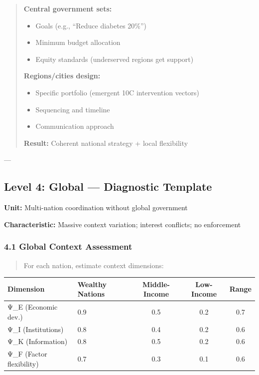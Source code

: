 \begin{quote}
\textbf{Central government sets:}
\begin{itemize}[nosep]
\item Goals (e.g., ``Reduce diabetes 20\%'')
\item Minimum budget allocation
\item Equity standards (underserved regions get support)
\end{itemize}

\textbf{Regions/cities design:}
\begin{itemize}[nosep]
\item Specific portfolio (emergent 10C intervention vectors)
\item Sequencing and timeline
\item Communication approach
\end{itemize}

\textbf{Result:} Coherent national strategy + local flexibility
\end{quote}

---


\subsection*{Level 4: Global --- Diagnostic Template}

\textbf{Unit:} Multi-nation coordination without global government

\textbf{Characteristic:} Massive context variation; interest conflicts; no enforcement

\subsubsection*{4.1 Global Context Assessment}

\begin{quote}
For each nation, estimate context dimensions:
\end{quote}

\begin{center}
\small
\begin{tabular}{@{}llccc@{}}
\toprule
\textbf{Dimension} & \textbf{Wealthy Nations} & \textbf{Middle-Income} & \textbf{Low-Income} & \textbf{Range} \\
\midrule
Ψ\_E (Economic dev.) & 0.9 & 0.5 & 0.2 & 0.7 \\
Ψ\_I (Institutions) & 0.8 & 0.4 & 0.2 & 0.6 \\
Ψ\_K (Information) & 0.8 & 0.5 & 0.2 & 0.6 \\
Ψ\_F (Factor flexibility) & 0.7 & 0.3 & 0.1 & 0.6 \\
\midrule
\end{tabular}
\end{center}

